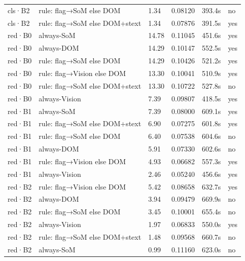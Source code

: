 \begin{table}[tp]
\begin{tabular}{@{}llllll@{}}
cls·B2 & rule: flag→SoM else DOM & 1.34 & 0.08120 & 393.4s & no \\
cls·B2 & rule: flag→SoM else DOM+\allowbreak{}stext & 1.34 & 0.07876 & 391.5s & yes \\
red·B0 & always-SoM & 14.78 & 0.11045 & 451.6s & yes \\
red·B0 & always-DOM & 14.29 & 0.10147 & 552.5s & yes \\
red·B0 & rule: flag→SoM else DOM & 14.29 & 0.10426 & 521.2s & yes \\
red·B0 & rule: flag→Vision else DOM & 13.30 & 0.10041 & 510.9s & yes \\
red·B0 & rule: flag→SoM else DOM+\allowbreak{}stext & 13.30 & 0.10722 & 527.8s & no \\
red·B0 & always-Vision & 7.39 & 0.09807 & 418.5s & yes \\
red·B1 & always-SoM & 7.39 & 0.08000 & 609.1s & yes \\
red·B1 & rule: flag→SoM else DOM+\allowbreak{}stext & 6.90 & 0.07275 & 601.8s & yes \\
red·B1 & rule: flag→SoM else DOM & 6.40 & 0.07538 & 604.6s & no \\
red·B1 & always-DOM & 5.91 & 0.07330 & 602.6s & no \\
red·B1 & rule: flag→Vision else DOM & 4.93 & 0.06682 & 557.3s & yes \\
red·B1 & always-Vision & 2.46 & 0.05240 & 456.6s & yes \\
red·B2 & rule: flag→Vision else DOM & 5.42 & 0.08658 & 632.7s & yes \\
red·B2 & always-DOM & 3.94 & 0.09479 & 669.9s & no \\
red·B2 & rule: flag→SoM else DOM & 3.45 & 0.10001 & 655.4s & no \\
red·B2 & always-Vision & 1.97 & 0.06833 & 550.0s & yes \\
red·B2 & rule: flag→SoM else DOM+\allowbreak{}stext & 1.48 & 0.09568 & 660.7s & no \\
red·B2 & always-SoM & 0.99 & 0.11160 & 623.0s & no \\
\bottomrule
\end{tabular}
\end{table}
